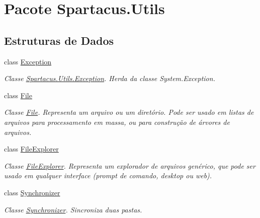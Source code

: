 \hypertarget{namespaceSpartacus_1_1Utils}{\section{Pacote Spartacus.\+Utils}
\label{namespaceSpartacus_1_1Utils}
}
\subsection*{Estruturas de Dados}
\begin{DoxyCompactItemize}
\item 
class \hyperlink{classSpartacus_1_1Utils_1_1Exception}{Exception}
\begin{DoxyCompactList}\small\item\em Classe \hyperlink{classSpartacus_1_1Utils_1_1Exception}{Spartacus.\+Utils.\+Exception}. Herda da classe System.\+Exception. \end{DoxyCompactList}\item 
class \hyperlink{classSpartacus_1_1Utils_1_1File}{File}
\begin{DoxyCompactList}\small\item\em Classe \hyperlink{classSpartacus_1_1Utils_1_1File}{File}. Representa um arquivo ou um diretório. Pode ser usado em listas de arquivos para processamento em massa, ou para construção de árvores de arquivos. \end{DoxyCompactList}\item 
class \hyperlink{classSpartacus_1_1Utils_1_1FileExplorer}{File\+Explorer}
\begin{DoxyCompactList}\small\item\em Classe \hyperlink{classSpartacus_1_1Utils_1_1FileExplorer}{File\+Explorer}. Representa um explorador de arquivos genérico, que pode ser usado em qualquer interface (prompt de comando, desktop ou web). \end{DoxyCompactList}\item 
class \hyperlink{classSpartacus_1_1Utils_1_1Synchronizer}{Synchronizer}
\begin{DoxyCompactList}\small\item\em Classe \hyperlink{classSpartacus_1_1Utils_1_1Synchronizer}{Synchronizer}. Sincroniza duas pastas. \end{DoxyCompactList}\end{DoxyCompactItemize}
